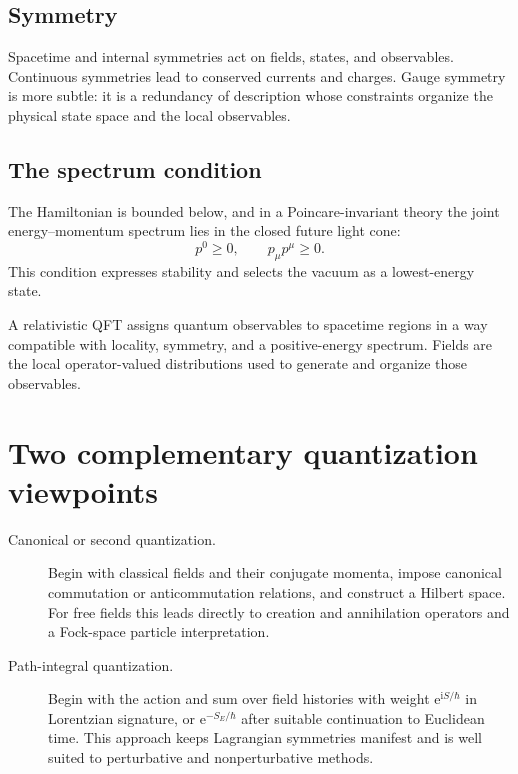 \documentclass[11pt]{article}
\newcommand{\e}{\mathrm{e}}
\newcommand{\ii}{\mathrm{i}}
\begin{document}
\subsection{Symmetry}

Spacetime and internal symmetries act on fields, states, and observables.
Continuous symmetries lead to conserved currents and charges.  Gauge
symmetry is more subtle: it is a redundancy of description whose constraints
organize the physical state space and the local observables.

\subsection{The spectrum condition}

The Hamiltonian is bounded below, and in a Poincare-invariant theory the
joint energy--momentum spectrum lies in the closed future light cone:
\begin{equation}
  p^0\ge0,
  \qquad
  p_\mu p^\mu\ge0.
\end{equation}
This condition expresses stability and selects the vacuum as a
lowest-energy state.

\begin{keyidea}
A relativistic QFT assigns quantum observables to spacetime regions in a way
compatible with locality, symmetry, and a positive-energy spectrum.
Fields are the local operator-valued distributions used to generate and
organize those observables.
\end{keyidea}

\section{Two complementary quantization viewpoints}

\begin{description}
  \item[Canonical or second quantization.]
  Begin with classical fields and their conjugate momenta, impose canonical
  commutation or anticommutation relations, and construct a Hilbert space.
  For free fields this leads directly to creation and annihilation
  operators and a Fock-space particle interpretation.

  \item[Path-integral quantization.]
  Begin with the action and sum over field histories with weight
  $\e^{\ii S/\hbar}$ in Lorentzian signature, or $\e^{-S_E/\hbar}$ after
  suitable continuation to Euclidean time.  This approach keeps Lagrangian
  symmetries manifest and is well suited to perturbative and
  nonperturbative methods.
\end{description}
\end{document}
